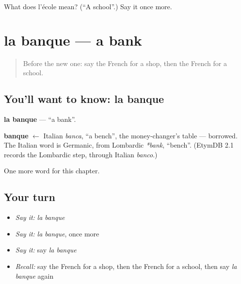 \begin{tcolorbox}[breakable,colback=teal!4,colframe=teal!35!black,title={Before you move on}]
What does l'école mean? (\textquotedblleft{}A school\textquotedblright{}.) Say it once more.
\end{tcolorbox}
\section[la banque]{la banque — a bank}

\label{lesson:FR-C99-banque}



\begin{quote}
Before the new one: say the French for a shop, then the French for a school.
\end{quote}

\subsection*{You'll want to know: la banque}
\textbf{la banque} — \textquotedblleft{}a bank\textquotedblright{}.

\begin{cousinweb}
\textbf{banque} $\leftarrow$ Italian \emph{banca}, \textquotedblleft{}a bench\textquotedblright{}, the money-changer's table — borrowed. The Italian word is Germanic, from Lombardic \emph{*bank}, \textquotedblleft{}bench\textquotedblright{}. (EtymDB 2.1 records the Lombardic step, through Italian \emph{banco}.)
\end{cousinweb}

\begin{grammarlens}[title={What you've built}]
One more word for this chapter.
\end{grammarlens}

\subsection*{Your turn}
\begin{itemize}
\raggedright
  \item \emph{Say it:} \emph{la banque}
  \item \emph{Say it:} \emph{la banque}, once more
  \item \emph{Say it:} say \emph{la banque}
  \item \emph{Recall:} say the French for a shop, then the French for a school, then say \emph{la banque} again
\end{itemize}

